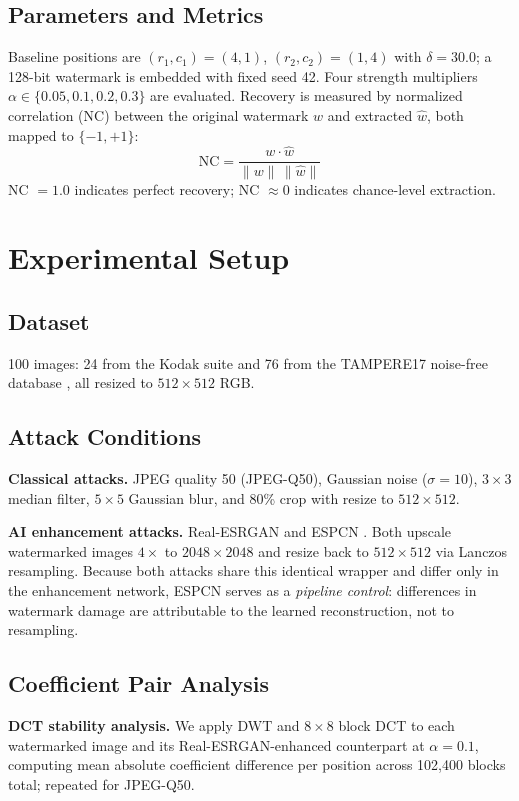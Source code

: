 \documentclass[conference]{IEEEtran}
\begin{document}
\subsection{Parameters and Metrics}
Baseline positions are $(r_1,c_1)=(4,1)$, $(r_2,c_2)=(1,4)$ with
$\delta=30.0$; a 128-bit watermark is embedded with fixed seed 42.
Four strength multipliers $\alpha \in \{0.05, 0.1, 0.2, 0.3\}$ are
evaluated. Recovery is measured by normalized correlation (NC) between
the original watermark $w$ and extracted $\hat{w}$, both mapped to
$\{-1,+1\}$:
\begin{equation}
\mathrm{NC} = \frac{w \cdot \hat{w}}{\lVert w \rVert\, \lVert \hat{w} \rVert}
\end{equation}
NC $= 1.0$ indicates perfect recovery; NC $\approx 0$ indicates
chance-level extraction.

\section{Experimental Setup}
\label{sec:setup}

\subsection{Dataset}
100 images: 24 from the Kodak suite \cite{kodak} and 76 from the
TAMPERE17 noise-free database \cite{tampere17}, all resized to
$512\times512$ RGB.

\subsection{Attack Conditions}
\textbf{Classical attacks.} JPEG quality 50 (JPEG-Q50), Gaussian noise
($\sigma=10$), $3\times3$ median filter, $5\times5$ Gaussian blur, and
80\% crop with resize to $512\times512$.

\textbf{AI enhancement attacks.} Real-ESRGAN \cite{realesrgan2021} and
ESPCN \cite{espcn2016}. Both upscale watermarked images $4\times$ to
$2048\times2048$ and resize back to $512\times512$ via Lanczos
resampling. Because both attacks share this identical wrapper and differ
only in the enhancement network, ESPCN serves as a \emph{pipeline
control}: differences in watermark damage are attributable to the learned
reconstruction, not to resampling.

\subsection{Coefficient Pair Analysis}
\textbf{DCT stability analysis.} We apply DWT and $8\times8$ block DCT
to each watermarked image and its Real-ESRGAN-enhanced counterpart at
$\alpha=0.1$, computing mean absolute coefficient difference per position
across 102,400 blocks total; repeated for JPEG-Q50.
\end{document}
